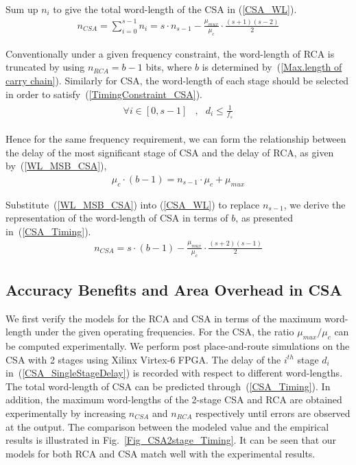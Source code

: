 \documentclass[prodmode,acmtrets]{acmsmall} %
\begin{document}
Sum up $n_i$ to give the total word-length of the CSA in (\ref{CSA_WL}).
%
\begin{eqnarray}\label{CSA_WL}
    n_{CSA} =\sum_{i=0}^{s-1}n_{i}= s\cdot n_{s-1}-\frac{\mu_{mux}}{\mu_{c}}\cdot\frac{(s+1)(s-2)}{2}
\end{eqnarray}

Conventionally under a given frequency constraint, the word-length of RCA is truncated by using $n_{RCA}=b-1$ bits, where $b$ is determined by~(\ref{Max.length of carry chain}). Similarly for CSA, the word-length of each stage should be selected in order to satisfy~(\ref{TimingConstraint_CSA}).
%
\begin{eqnarray}\label{TimingConstraint_CSA}
  \begin{matrix}
    \forall i\in[0,s-1] &, & d_i\leqslant\frac{1}{f_s}
  \end{matrix}
\end{eqnarray}

Hence for the same frequency requirement, we can form the relationship between the delay of the most significant stage of CSA and the delay of RCA, as given by~(\ref{WL_MSB_CSA}),
%
\begin{eqnarray}\label{WL_MSB_CSA}
    \mu_c\cdot (b-1) = n_{s-1}\cdot\mu_c+\mu_{mux}
\end{eqnarray}

Substitute~(\ref{WL_MSB_CSA}) into (\ref{CSA_WL}) to replace $n_{s-1}$, we derive the representation of the word-length of CSA in terms of $b$, as presented in~(\ref{CSA_Timing}).
%
\begin{eqnarray}\label{CSA_Timing}
  n_{CSA}=s\cdot (b-1)-\frac{\mu_{mux}}{\mu_{c}}\cdot\frac{(s+2)(s-1)}{2}
\end{eqnarray}

\subsection{Accuracy Benefits and Area Overhead in CSA}
We first verify the models for the RCA and CSA in terms of the maximum word-length under the given operating frequencies. For the CSA, the ratio $\mu_{mux}/\mu_c$ can be computed experimentally. We perform post place-and-route simulations on the CSA with 2 stages using Xilinx Virtex-6 FPGA. The delay of the $i^{th}$ stage $d_i$ in~(\ref{CSA_SingleStageDelay}) is recorded with respect to different word-lengths. The total word-length of CSA can be predicted through~(\ref{CSA_Timing}). In addition, the maximum word-lengths of the 2-stage CSA and RCA are obtained experimentally by increasing $n_{CSA}$ and $n_{RCA}$ respectively until errors are observed at the output. The comparison between the modeled value and the empirical results is illustrated in Fig.~\ref{Fig_CSA2stage_Timing}. It can be seen that our models for both RCA and CSA match well with the experimental results.
\end{document}
